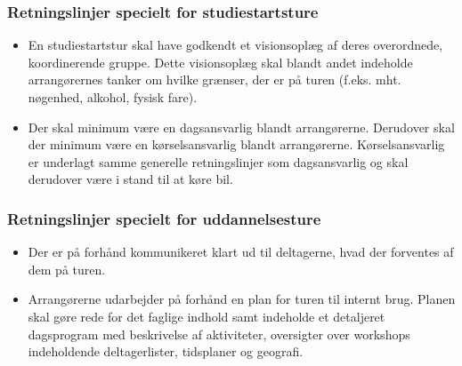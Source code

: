 \subsubsection{Retningslinjer specielt for studiestartsture}
\begin{itemize}\addtolength{\itemsep}{-0.5\baselineskip}
\item En studiestartstur skal have godkendt et visionsoplæg af deres overordnede, koordinerende gruppe. Dette
visionsoplæg skal blandt andet indeholde arrangørernes tanker om hvilke grænser, der er på turen (f.eks. mht.
nøgenhed, alkohol, fysisk fare).
\item Der skal minimum være en dagsansvarlig blandt arrangørerne. Derudover skal der minimum være en kørselsansvarlig blandt arrangørerne. Kørselsansvarlig er underlagt samme generelle retningslinjer som dagsansvarlig og skal derudover være i stand til at køre bil.
\end{itemize}

\subsubsection{Retningslinjer specielt for uddannelsesture}
\begin{itemize}\addtolength{\itemsep}{-0.5\baselineskip}
\item Der er på forhånd kommunikeret klart ud til deltagerne, hvad der forventes af dem på turen.
\item Arrangørerne udarbejder på forhånd en plan for turen til internt brug. Planen skal gøre rede for det faglige
indhold samt indeholde et detaljeret dagsprogram med beskrivelse af aktiviteter, oversigter over workshops
indeholdende deltagerlister, tidsplaner og geografi.
\end{itemize}
